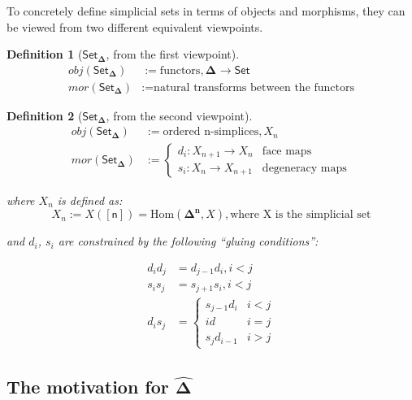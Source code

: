 \documentclass[10pt, titlepage]{amsart}
\newtheorem{definition}{Definition}
\newcommand{\Set}{\ensuremath{\mathsf{Set}}}
\newcommand{\Simplex}[1]{\ensuremath{\boldsymbol{\Delta^{#1}}}}
\newcommand{\DeltaHat}{\ensuremath{\hat{\boldsymbol{\Delta}}}}
\newcommand{\SSet}{\ensuremath{\mathsf{Set}_{\boldsymbol{\Delta}}}}
\newcommand{\sq}[1]{\ensuremath{\mathsf{[#1]}}}
\begin{document}
To concretely define simplicial sets in terms of objects and morphisms, they can be viewed from two different equivalent viewpoints.

\begin{definition}[\SSet, from the first viewpoint]
  \begin{align*}
    obj(\SSet) & := \text{functors}, \Simplex{} \rightarrow \Set   \\
    mor(\SSet) & := \text{natural transforms between the functors}
  \end{align*}
\end{definition}

\begin{definition}[\SSet, from the second viewpoint]
  \begin{align*}
    obj(\SSet) & := \text{ordered n-simplices}, X_n \\
    mor(\SSet) & :=
    \begin{cases}
      d_i : X_{n + 1} \rightarrow X_n & \text{face maps}       \\
      s_i : X_n \rightarrow X_{n + 1} & \text{degeneracy maps}
    \end{cases}
  \end{align*}

  where $X_n$ is defined as:
  \begin{equation*}
    X_n := X(\sq{n}) = \text{Hom}(\Simplex{n}, X), \text{where X is the simplicial set}
  \end{equation*}

  and $d_i$, $s_i$ are constrained by the following ``gluing conditions'':

  \begin{align*}
    d_i d_j & = d_{j - 1} d_i, i < j \\
    s_i s_j & = s_{j + 1} s_i, i < j \\
    d_i s_j & =
    \begin{cases}
      s_{j - 1} d_i & i < j \\
      id            & i = j \\
      s_j d_{i - 1} & i > j
    \end{cases}
  \end{align*}
\end{definition}

\subsection{The motivation for \texorpdfstring{\DeltaHat}{delta sets}}
\end{document}

